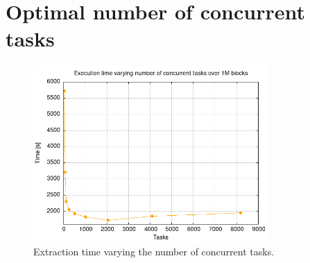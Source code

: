 \section{Optimal number of concurrent tasks} 

\begin{figure}[!ht]
    \centering
    \includegraphics[width=0.8\textwidth]{Figures/results/num-tasks.png}
    \caption{Extraction time varying the number of concurrent tasks.}
    \label{fig:num-tasks}
\end{figure}

